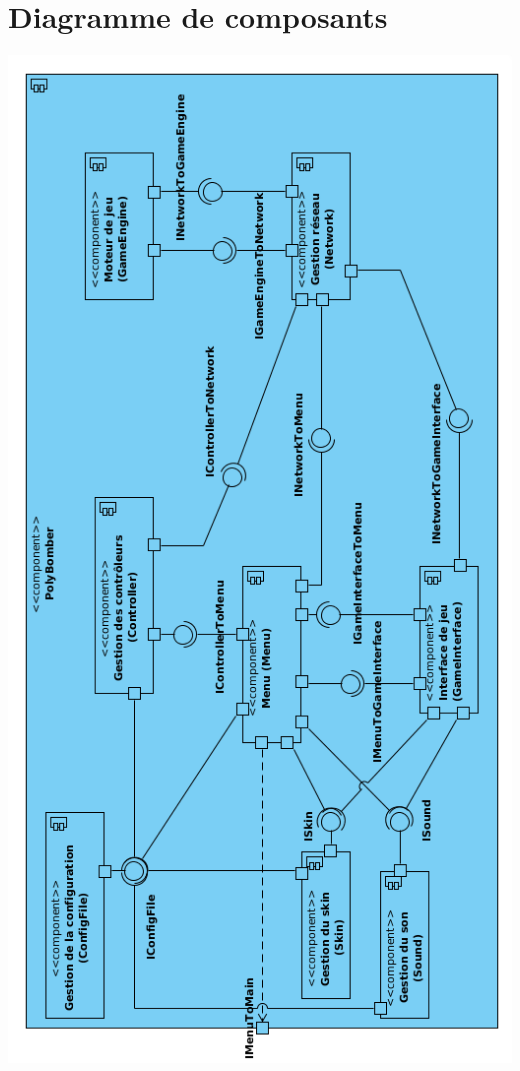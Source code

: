 \section{Diagramme de composants}

\begin{center}
\includegraphics[scale=0.65]{images/UML/composants.png}
\end{center}

